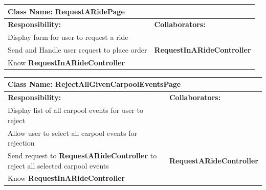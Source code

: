 \documentclass[]{article}
\begin{document}
\begin{table}[H]
    \centering
    \begin{tabular}{|p{5cm}|p{5cm}|}
        \hline 
        \multicolumn{2}{|l|}{\textbf{Class Name:} RequestARidePage} \\
        \hline
        \textbf{Responsibility:} & \textbf{Collaborators:} \\
        \hline
        Display form for user to request a ride & \\
        \hline
        Send and Handle user request to place order & \textbf{RequestInARideController}  \\
        \hline
        Know \textbf{RequestInARideController}  & \phantom{} \\
    \hline
    \end{tabular}
\end{table}

\begin{table}[H]
    \centering
    \begin{tabular}{|p{5cm}|p{5cm}|}
        \hline 
        \multicolumn{2}{|l|}{\textbf{Class Name:} RejectAllGivenCarpoolEventsPage} \\
        \hline
        \textbf{Responsibility:} & \textbf{Collaborators:} \\
        \hline
        Display list of all carpool events for user to reject & \phantom{} \\
        \hline
        Allow user to select all carpool events for rejection & \phantom{} \\
        \hline
        Send request to \textbf{RequestARideController} to reject all selected carpool events & \textbf{RequestARideController} \\
        \hline
        Know \textbf{RequestInARideController}  & \phantom{} \\
    \hline
    \end{tabular}
\end{table}
\end{document}
